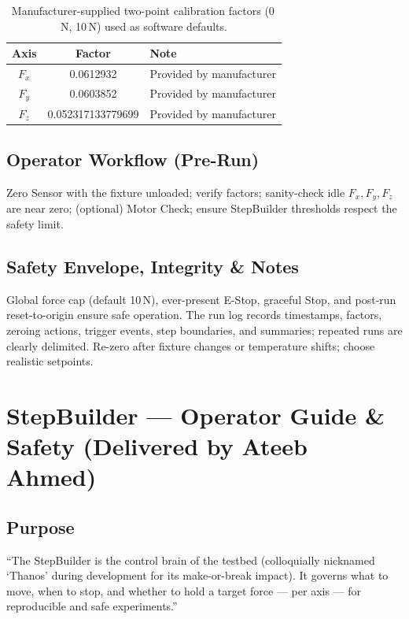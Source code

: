 \documentclass[
    twocolumn,
    fontsize = 10pt,
    parskip = half+,
    headings = small,
    headwidth = text,
    footwidth = text,
]{scrartcl}
\begin{document}
\begin{table}[htbp]
\centering
\caption{Manufacturer-supplied two-point calibration factors (0\,N, 10\,N) used as software defaults.}
\label{tab:calibration-factors}
\begin{tabular}{|c|c|l|}
\hline
\textbf{Axis} & \textbf{Factor} & \textbf{Note} \\
\hline
$F_x$ & 0.0612932 & Provided by manufacturer \\
$F_y$ & 0.0603852 & Provided by manufacturer \\
$F_z$ & 0.052317133779699 & Provided by manufacturer \\
\hline
\end{tabular}
\end{table}


\subsection{Operator Workflow (Pre-Run)}
Zero Sensor with the fixture unloaded; verify factors; sanity-check idle $F_x, F_y, F_z$ are near zero; (optional) Motor Check; ensure StepBuilder thresholds respect the safety limit.

\subsection{Safety Envelope, Integrity \& Notes}
Global force cap (default 10\,N), ever-present E-Stop, graceful Stop, and post-run reset-to-origin ensure safe operation. The run log records timestamps, factors, zeroing actions, trigger events, step boundaries, and summaries; repeated runs are clearly delimited. Re-zero after fixture changes or temperature shifts; choose realistic setpoints.


\section{StepBuilder — Operator Guide \& Safety \textnormal{(Delivered by Ateeb Ahmed)}}
\label{sec:stepbuilder}

\subsection{Purpose}
``The StepBuilder is the control brain of the testbed (colloquially nicknamed `Thanos' during development for its make-or-break impact). It governs what to move, when to stop, and whether to hold a target force — per axis — for reproducible and safe experiments.''
\end{document}
